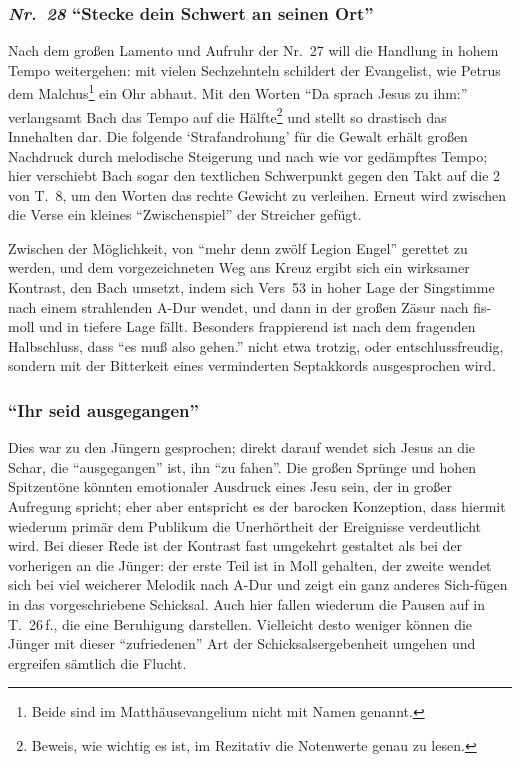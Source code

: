\documentclass[a4paper,11pt,twoside]{scrartcl}
\newcommand{\Nr}[1]{\textmd{\textit{Nr.~#1}}}
\begin{document}
\subsubsection*{\Nr{28} \enquote{Stecke dein Schwert an seinen Ort}}
Nach dem großen Lamento und Aufruhr der Nr.~27 will die Handlung in
hohem Tempo weitergehen: mit vielen Sechzehnteln schildert der
Evangelist, wie Petrus dem Malchus\footnote{Beide sind im Matthäusevangelium
nicht mit Namen genannt.} ein Ohr abhaut.  Mit den Worten \enquote{Da
sprach Jesus zu ihm:} verlangsamt Bach das Tempo auf die Hälfte\footnote{Beweis,
wie wichtig es ist, im Rezitativ die Notenwerte genau zu lesen.}
und stellt so drastisch das Innehalten dar.  Die folgende \enquote*{Strafandrohung}
für die Gewalt erhält großen Nachdruck durch melodische Steigerung und
nach wie vor gedämpftes Tempo; hier verschiebt Bach sogar den textlichen
Schwerpunkt gegen den Takt auf die 2 von T.~8, um den Worten das rechte
Gewicht zu verleihen.  Erneut wird zwischen die Verse ein kleines
\enquote{Zwischenspiel} der Streicher gefügt.

Zwischen der Möglichkeit, von \enquote{mehr denn zwölf Legion Engel}
gerettet zu werden, und dem vorgezeichneten Weg ans Kreuz ergibt sich
ein wirksamer Kontrast, den Bach umsetzt, indem sich Vers~53 in hoher
Lage der Singstimme nach einem strahlenden A-Dur wendet, und dann in
der großen Zäsur nach fis-moll und in tiefere Lage fällt.  Besonders
frappierend ist nach dem fragenden Halbschluss, dass \enquote{es muß
also gehen.} nicht etwa trotzig, oder entschlussfreudig, sondern mit
der Bitterkeit eines verminderten Septakkords ausgesprochen wird.

\subsubsection*{\enquote{Ihr seid ausgegangen}}
Dies war zu den Jüngern gesprochen; direkt darauf wendet sich Jesus
an die Schar, die \enquote{ausgegangen} ist, ihn \enquote{zu fahen}.  Die
großen Sprünge und hohen Spitzentöne könnten emotionaler Ausdruck eines
Jesu sein, der in großer Aufregung spricht; eher aber entspricht es
der barocken Konzeption, dass hiermit wiederum primär dem Publikum die
Unerhörtheit der Ereignisse verdeutlicht wird.  Bei dieser Rede ist
der Kontrast fast umgekehrt gestaltet als bei der vorherigen an die
Jünger: der erste Teil ist in Moll gehalten, der zweite wendet sich
bei viel weicherer Melodik nach A-Dur und zeigt ein ganz anderes
Sich-fügen in das vorgeschriebene Schicksal.  Auch hier fallen wiederum
die Pausen auf in T.~26\,f., die eine Beruhigung darstellen.  Vielleicht
desto weniger können die Jünger mit dieser \enquote{zufriedenen} Art
der Schicksalsergebenheit umgehen und ergreifen sämtlich die Flucht.
\end{document}
